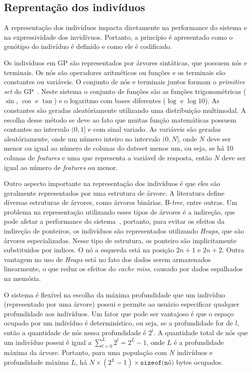 \documentclass[a4paper]{article}
\begin{document}
\subsection{Reprentação dos indivíduos} \label{subsec:representacao}
A representação dos indivíduos impacta diretamente na performance do sistema e
na expressividade dos invidívuos. Portanto, a princípio é apresentado como o
genótipo do indivíduo é definido e como ele é codificado.


Os indivíduos em GP são representados por árvores sintáticas, que possuem nós e
terminais. Os nós são operadores aritméticos ou funções e os terminais são
constantes ou variáveis. O conjunto de nós e terminais juntos formam o
\textit{primitive set} do GP~\citep{poli2008}. Neste sistema o conjunto de
funções são as funções trigonométricas ($\sin$, $\cos$ e $\tan$) e o logaritmo
com bases diferentes ($\log$ e $\log10$). As constantes são geradas
aleatóriamente utilizando uma distribuição multimodal. A escolha desse método se
deve ao fato que muitas função matemáticas possuem contantes no intervalo $(0,
1]$ e com sinal variado.  As variáveis são geradas aleatóriamente, onde um
  número inteiro no intervalo $(0, N]$, onde $N$ deve ser menor ou igual ao
    número de colunas do dateset menos um, ou seja, se há 10 colunas de
    \textit{features} e uma que representa a variável de resposta, então $N$
    deve ser igual ao número de \textit{features} ou menor.

Outro aspecto importante na representação dos indivíduos é que eles são
geralmente representados por uma estrutura de árvore. A literatura define
diversas estruturas de árvores, como árvores binárias, B-\textit{tree}, entre
outras. Um problema na representação utilizando esses tipos de árvores é a
indireção, que pode afetar a performance do sistema~\citep{faria2013}, portanto,
para evitar os efeitos da indireção de ponteiros, os indivíduos são
representados utilizando \textit{Heaps}, que são árvores especializadas. Nesse
tipo de estrutura, os ponteiro são implicitamente substituidos por indices. O nó
a esquerda está na posição $2n+1$ e $2n + 2$. Outra vantagem no uso de
\textit{Heaps} está no fato dos dados serem armazenados linearmente, o que reduz
os efeitos do \textit{cache miss}, causado por dados espalhados na memória.

O sistema é flexível na escolha da máxima profundidade que um indivíduo
(representado por uma árvore) possui e permite ao usuário especificar qualquer
profundidade aos indivíduos.  Um fator que pode ser vantajoso é que o espaço
ocupado por um indivíduo é determinístico, ou seja, se a profundidade for de
$l$, então a quantidade de nós nessa profundidade é $2^l$.  A quantidade total
de nós que um indivíduo possui é igual a $\sum_{l=0}^{L}2^l=2^{L}-1$, onde $L$ é
a profundidade máxima da árvore. Portanto, para uma população com $N$ indivíduos
e profundidade máxima $L$, há $N\times(2^{L}-1)\times\texttt{sizeof(nó)}$ bytes
ocupados.
\end{document}
